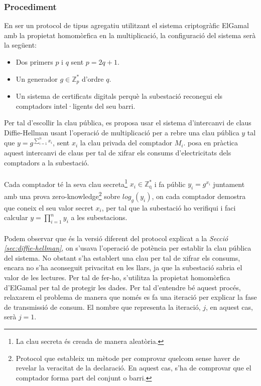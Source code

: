 \subsubsection{Procediment}
En ser un protocol de tipus agregatiu utilitzant el sistema criptogràfic ElGamal amb la propietat homomòrfica en la multiplicació, la configuració del sistema serà la següent:
\begin{itemize}
	\item Dos primers $p$ i $q$ sent $p = 2q+1$.
	\item Un generador $g \in \mathbb{Z}_p^*$ d'ordre $q$.
	\item Un sistema de certificats digitals perquè la subestació reconegui els comptadors intel·ligents del seu barri.
\end{itemize}
Per tal d'escollir la clau pública, es proposa usar el sistema d'intercanvi de claus Diffie-Hellman usant l'operació de multiplicació per a rebre una clau pública $y$ tal que $y=g^{\sum_{i=1}^{n} x_i}$, sent $x_i$ la clau privada del comptador $M_i$. \cite{busom} posa en pràctica aquest intercanvi de claus per tal de xifrar els consums d'electricitats dels comptadors a la subestació. 
\\
\\
Cada comptador té la seva clau secreta\footnote{La clau secreta és creada de manera aleatòria.} $x_i \in \mathbb{Z_q^*} $ i fa públic $y_i = g^{x_i}$ juntament amb una prova zero-knowledge\footnote{Protocol que estableix un mètode per comprovar quelcom sense haver de revelar la veracitat de la declaració. En aquest cas, s'ha de comprovar que el comptador forma part del conjunt o barri.} sobre $log_g(y_i)$, on cada comptador demostra que coneix el seu valor secret $x_i$, per tal que la subestació ho verifiqui i faci calcular $y = \prod_{i=1}^{n} y_i$ a les subestacions.
\\
\\
Podem observar que és la versió diferent del protocol explicat a la \textit{Secció \ref{sec:diffie-hellman}}, on s'usava l'operació de potència per establir la clau pública del sistema.
No obstant s'ha establert una clau per tal de xifrar els consums, encara no s'ha aconseguit privacitat en les llars, ja que la subestació sabria el valor de les lectures. Per tal de fer-ho, s'utilitza la propietat homomòrfica d'ElGamal per tal de protegir les dades. Per tal d'entendre bé aquest procés, relaxarem el problema de manera que només es fa una iteració per explicar la fase de transmissió de consum. El nombre que representa la iteració, $j$, en aquest cas, serà $j = 1$.
